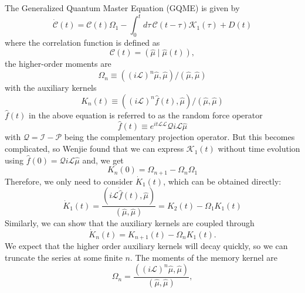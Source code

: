


The Generalized Quantum Master Equation (GQME) is given by
\begin{equation}
\dot{\mathcal{C}}(t) = \mathcal{C}(t) {\Omega_1} - \int_{0}^{t} d \tau\, \mathcal{C}(t - \tau) \mathcal{K}_1(\tau) + D(t)
\label{eq:GQME}
\end{equation}
where the correlation function is defined as 
\begin{equation}
    \mathcal{C}(t) = (\hat{{\mu}} \mid \hat{{\mu}}(t)),
\label{eq:C}
\end{equation}
the higher-order moments are
\begin{equation}
\Omega_{n} \equiv\left((i \mathcal{L})^{n} \hat{{\mu}}, \hat{{\mu}}\right) /(\hat{{\mu}}, \hat{{\mu}})
\end{equation}
with the auxiliary kernels
\begin{equation}
K_{n}(t) \equiv\left((i \mathcal{L})^{n} \hat{f}(t), \hat{{\mu}}\right) /(\hat{{\mu}}, \hat{{\mu}})
\end{equation}
$\hat{f}(t)$ in the above equation is referred to as the random force operator
\begin{equation}
\hat{f}(t) \equiv e^{i t {\mathcal { L }} \mathcal{L}} \mathcal{Q} i \mathcal{L} \hat{{\mu}}
\end{equation}
with $\mathcal{Q}={\mathcal { I }}-\mathcal{P}$ being the complementary projection operator. But this becomes complicated, so Wenjie found that we can express $\mathcal{K}_1(t)$ without time evolution using $\hat{f}(0)=\mathcal{Q} i \mathcal{L} \hat{\mu}$ and, we get
\begin{equation}
K_{n}(0)=\Omega_{n+1}-\Omega_{n} \Omega_{1}
\end{equation}
Therefore, we only need to consider $\dot{K}_{1}(t)$, which can be obtained directly:
\begin{equation}
\dot{K}_{1}(t)=\frac{(i \mathcal{L} \dot{\hat{f}}(t), \hat{\mu})}{(\hat{\mu}, \hat{\mu})}=K_{2}(t)-\Omega_{1} K_{1}(t)
\end{equation}
Similarly, we can show that the auxiliary kernels are coupled through
\begin{equation}
\dot{K}_{n}(t)=K_{n+1}(t)-\Omega_{n} K_{1}(t).
\end{equation}
We expect that the higher order auxiliary kernels will decay quickly, so we can truncate the series at some finite $n$.
The moments of the memory kernel are
\begin{equation}
    \Omega_n = \frac{ \left( (i \mathcal{L})^{n} \hat{{\mu}}, \hat{{\mu}} \right) }{ (\hat{{\mu}}, \hat{{\mu}}) },
\label{eq:Omega}
\end{equation}
